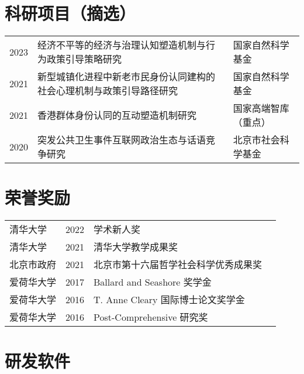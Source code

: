 \documentclass[
  12pt,
]
{article}
\begin{document}
\hypertarget{ux79d1ux7814ux9879ux76eeux6458ux9009}{%
\section{科研项目（摘选）}\label{ux79d1ux7814ux9879ux76eeux6458ux9009}}

\begin{table}[!h]
\centering
\begin{tabular}{lll}

2023 & 经济不平等的经济与治理认知塑造机制与行为政策引导策略研究 & 国家自然科学基金\\
2021 & 新型城镇化进程中新老市民身份认同建构的社会心理机制与政策引导路径研究 & 国家自然科学基金\\
2021 & 香港群体身份认同的互动塑造机制研究 & 国家高端智库（重点）\\
2020 & 突发公共卫生事件互联网政治生态与话语竞争研究 & 北京市社会科学基金\\

\end{tabular}
\end{table}

\hypertarget{ux8363ux8a89ux5956ux52b1}{%
\section{荣誉奖励}\label{ux8363ux8a89ux5956ux52b1}}

\begin{table}[!h]
\centering
\begin{tabular}{llll}

清华大学 & 2022 & 学术新人奖 & \\
清华大学 & 2021 & 清华大学教学成果奖 & \\
北京市政府 & 2021 & 北京市第十六届哲学社会科学优秀成果奖 & \\
爱荷华大学 & 2017 & Ballard and Seashore 奖学金 & \\
爱荷华大学 & 2016 & T. Anne Cleary 国际博士论文奖学金 & \\
\addlinespace
爱荷华大学 & 2016 & Post-Comprehensive 研究奖 & \\

\end{tabular}
\end{table}

\hypertarget{ux7814ux53d1ux8f6fux4ef6}{%
\section{研发软件}\label{ux7814ux53d1ux8f6fux4ef6}}
\end{document}

